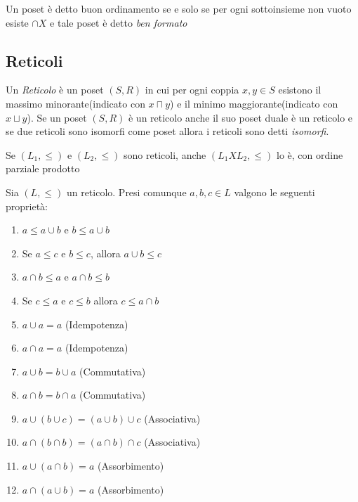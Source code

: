 \begin{defi}
    Un poset è detto buon ordinamento se e solo se per ogni sottoinsieme non vuoto esiste
    $\cap X$ e tale poset è detto \emph{ben formato}
\end{defi}

\subsection{Reticoli}
Un \emph{Reticolo} è un poset $(S,R)$ in cui per ogni coppia $x,y \in S$ esistono
il massimo minorante(indicato con $x \sqcap y$) e il minimo maggiorante(indicato con $x \sqcup y$).
Se un poset $(S,R)$ è un reticolo anche il suo poset duale è un reticolo e se due
reticoli sono isomorfi come poset allora i reticoli sono detti \emph{isomorfi}.

\begin{prop}
    Se $(L_1,\leq)$ e $(L_2,\leq)$ sono reticoli, anche $(L_1 X L_2,\leq)$ lo è,
    con ordine parziale prodotto
\end{prop}

\begin{defi}
Sia $(L,\leq)$ un reticolo. Presi comunque $a,b,c \in L$ valgono le seguenti proprietà:
\end{defi}
\begin{enumerate}
    \item $a \leq a \cup b$ e $b \leq a \cup b$
    \item Se $a \leq c$ e $b \leq c$, allora $a \cup b \leq c$
    \item $a \cap b \leq a$ e $a \cap b \leq b$
    \item Se $c \leq a$ e $c \leq b$ allora $c \leq a \cap b$
    \item $a \cup a = a$ (Idempotenza)
    \item $a \cap a = a$ (Idempotenza)
    \item $a \cup b = b \cup a$ (Commutativa)
    \item $a \cap b = b \cap a$ (Commutativa)
    \item $a \cup (b \cup c) = (a \cup b) \cup c$ (Associativa)
    \item $a \cap (b \cap b) = (a \cap b) \cap c$ (Associativa)
    \item $a \cup(a \cap b) = a$ (Assorbimento)
    \item $a \cap (a \cup b) = a$ (Assorbimento)
\end{enumerate}

